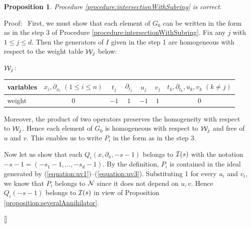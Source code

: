 \documentclass[12pt]{article}
\def\Isc{ {\cal I} }
\def\Nsc{ {\cal N} }
\newenvironment{proof}{\par\noindent Proof:\ }{${\tt [}\kern-0.2mm{\tt ]}$}
\newtheorem{proposition}[theorem]{Proposition}
\begin{document}
\begin{proposition}
\label{proposition:4.2}
Procedure \ref{procedure:intersectionWithSubring} is correct.
\end{proposition}

\begin{proof}
First, we must show that each element of $G_0$ can be written in the form 
as in the step 3 of Procedure \ref{procedure:intersectionWithSubring}. 
Fix any $j$ with $1 \leq j \leq d$.  Then
the generators of $I$ given in the step 1 are
homogeneous with respect to the weight table ${\cal W}_j$ below: 
\begin{center} ${\cal W}_j$: 
\begin{tabular}{|l||c|c|c|c|c|c|} \hline
variables & $x_i,\partial_{x_i}\,\,(1\leq i \leq n)$ & $t_j$ & $\partial_{t_j}$
& $u_j$ & $v_j$ & $t_k,\partial_{t_k},u_k,v_k\,\,(k \neq j)$ \\ \hline
weight  & $0$ & $-1$ & $1$ & $-1$ & $1$ & $0$ \\ \hline
\end{tabular}
\end{center}
Moreover, the product of two operators preserves the homogeneity with respect 
to ${\cal W}_j$.
Hence each element of $G_0$ is homogeneous with respect to ${\cal W}_j$ and
free of $u$ and $v$.  This enables us to write $P_i$ in the form as in 
the step 3.

Now let us show that each $Q_i(x,\partial_x,-s-1)$ belongs to $\Isc(s)$
with the notation $-s-1 = (-s_1-1,\dots,-s_d-1)$.  
By the definition, $P_i$ is contained in the ideal generated by
(\ref{equation:uv1})--(\ref{equation:uv3}).  
Substituting 1 for every $u_i$ and $v_i$, we know that
$P_i$ belongs to $\Nsc$ since it does not depend on $u,v$.
Hence $Q_i(-s-1)$  belongs to $\Isc(s)$ in view of 
Proposition \ref{proposition:severalAnnihilator}.


\end{proof}
\end{document}

